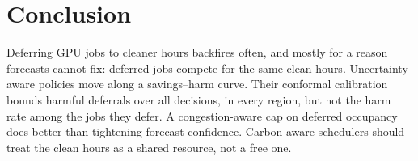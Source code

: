 \section{Conclusion}\label{sec:conclusion}
Deferring GPU jobs to cleaner hours backfires often, and mostly for a reason forecasts cannot fix:
deferred jobs compete for the same clean hours. Uncertainty-aware policies move along a savings--harm
curve. Their conformal calibration bounds harmful deferrals over all decisions, in every region, but
not the harm rate among the jobs they defer. A congestion-aware cap on deferred
occupancy does better than tightening forecast confidence. Carbon-aware schedulers should treat the
clean hours as a shared resource, not a free one.
